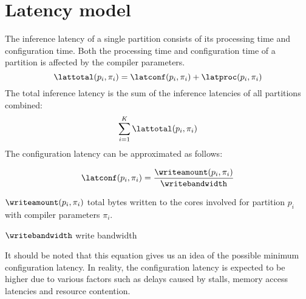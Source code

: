\section{Latency model}
The inference latency of a single partition consists of its processing time and configuration time.
Both the processing time and configuration time of a partition is affected by the compiler parameters.
\begin{equation}
    \lattotal(p_i, \pi_i) = \latconf(p_i, \pi_i) + \latproc(p_i, \pi_i)
\end{equation}
The total inference latency is the sum of the inference latencies of all partitions combined:
\begin{equation}
    \sum_{i=1}^{K} \lattotal(p_i, \pi_i)
\end{equation}
The configuration latency can be approximated as follows:

\begin{equation}
    \latconf(p_i, \pi_i) = \frac{\writeamount(p_i, \pi_i)}{\writebandwidth}
\end{equation}
\eqexplSetItemWidth{6em}
\begin{eqexpl}
    \item{$\writeamount(p_i, \pi_i)$} total bytes written to the cores involved for partition $p_i$ with compiler parameters $\pi_i$.
    \item{$\writebandwidth$} write bandwidth
\end{eqexpl}

\vspace{1em}

It should be noted that this equation gives us an idea of the possible minimum configuration latency.
In reality, the configuration latency is expected to be higher due to various factors such as delays caused by stalls, memory access latencies and resource contention.

